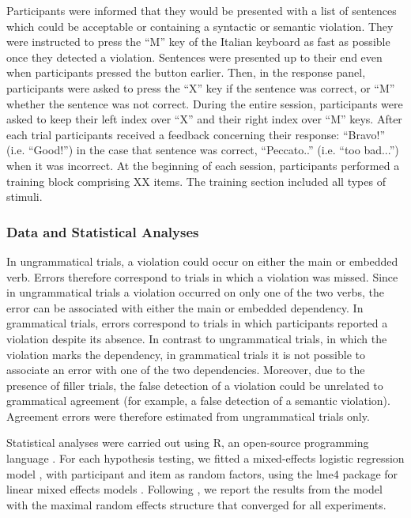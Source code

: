 Participants were informed that they would be presented with a list of sentences which could be acceptable or containing a syntactic or semantic violation. They were instructed to press the “M” key of the Italian keyboard as fast as possible once they detected a violation. Sentences were presented up to their end even when participants pressed the button earlier. Then, in the response panel, participants were asked to press the “X” key if the sentence was correct, or “M” whether the sentence was not correct. During the entire session, participants were asked to keep their left index over “X” and their right index over “M” keys. After each trial participants received a feedback concerning their response: ``Bravo!'' (i.e. ``Good!'') in the case that sentence was correct, ``Peccato..'' (i.e. ``too bad...'') when it was incorrect. At the beginning of each session, participants performed a training block comprising XX items. The training section included all types of stimuli.

\subsubsection{Data and Statistical Analyses}
In ungrammatical trials, a violation could occur on either the main or embedded verb. Errors therefore correspond to trials in which a violation was missed. Since in ungrammatical trials a violation occurred on only one of the two verbs, the error can be associated with either the main or embedded dependency. In grammatical trials, errors correspond to trials in which participants reported a violation despite its absence. In contrast to ungrammatical trials, in which the violation marks the dependency, in grammatical trials it is not possible to associate an error with one of the two dependencies. Moreover, due to the presence of filler trials, the false detection of a violation could be unrelated to grammatical agreement (for example, a false detection of a semantic violation). Agreement errors were therefore estimated from ungrammatical trials only.

Statistical analyses were carried out using R, an open-source programming language \citep{R}. For each hypothesis testing, we fitted a mixed-effects logistic regression model \citep{Jaeger2008}, with participant and item as random factors, using the lme4 package for linear mixed effects models \citep{Bates}. Following \citet{Baayen:etal:2008}, we report the results from the model with the maximal random effects structure that converged for all experiments. 

